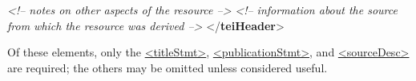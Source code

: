 \begin{shaded}
\hspace*{1em}\mbox{}\newline 
\hspace*{1em}\hspace*{1em}\mbox{}\newline 
\textit{<!-- notes on other aspects of the resource -->}\mbox{}\newline 
\hspace*{1em}\hspace*{1em}\mbox{}\newline 
\hspace*{1em}\mbox{}\newline 
\hspace*{1em}\mbox{}\newline 
\hspace*{1em}\hspace*{1em}\mbox{}\newline 
\textit{<!-- information about the source from which\newline
			       the resource was derived  -->}\mbox{}\newline 
\hspace*{1em}\hspace*{1em}\mbox{}\newline 
\hspace*{1em}\mbox{}\newline 
{}\mbox{}\newline 
{</\textbf{teiHeader}>}\end{shaded}\egroup\par \noindent  Of these elements, only the \hyperref[TEI.titleStmt]{<titleStmt>}, \hyperref[TEI.publicationStmt]{<publicationStmt>}, and \hyperref[TEI.sourceDesc]{<sourceDesc>} are required; the others may be omitted unless considered useful.
